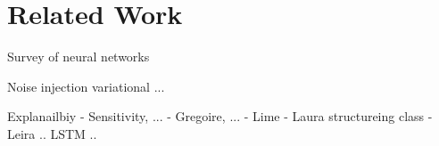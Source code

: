 \chapter{Related Work}
\label{cha:chapter2}

Survey of neural networks

Noise injection
variational ... 

Explanailbiy 
- Sensitivity, ... 
 - Gregoire, ...
 - Lime
 - Laura structureing class
 - Leira ..  LSTM .. 
 
 